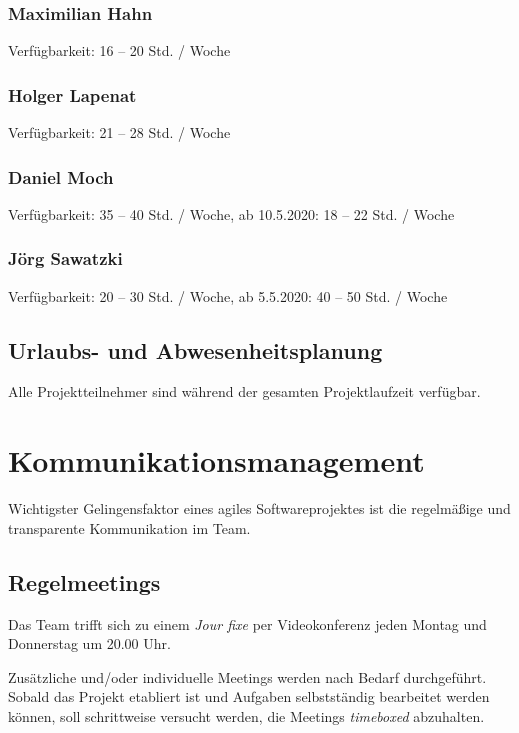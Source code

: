 \documentclass[a4paper,11pt,listof=numbered,glossary=totoc,parskip=half,toc=bib]{scrreprt}
\begin{document}
{\subsection{Maximilian Hahn}

Verfügbarkeit: 16 -- 20 Std. / Woche

\subsection{Holger Lapenat}

Verfügbarkeit: 21 -- 28 Std. / Woche

\subsection{Daniel Moch}

Verfügbarkeit: 35 -- 40 Std. / Woche, ab 10.5.2020: 18 -- 22 Std. / Woche

\subsection{Jörg Sawatzki}

Verfügbarkeit: 20 -- 30 Std. / Woche, ab 5.5.2020: 40 -- 50 Std. / Woche


\section{Urlaubs- und Abwesenheitsplanung}
Alle Projektteilnehmer sind während der gesamten Projektlaufzeit verfügbar.

\newpage
	\chapter{Kommunikationsmanagement}
	\label{sec:kommunikationsmanagement}
	
Wichtigster Gelingensfaktor eines agiles Softwareprojektes ist die regelmäßige und transparente Kommunikation im Team.

\section{Regelmeetings}

Das Team trifft sich zu einem \textit{Jour fixe} per Videokonferenz jeden Montag und Donnerstag um 20.00 Uhr.

Zusätzliche und/oder individuelle Meetings werden nach Bedarf durchgeführt.
Sobald das Projekt etabliert ist und Aufgaben selbstständig bearbeitet werden können, soll schrittweise versucht werden, die Meetings \textit{timeboxed} abzuhalten.

}
\end{document}
